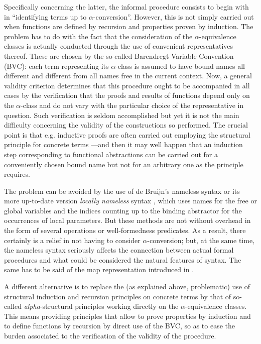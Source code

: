 \documentclass{entcs}
\begin{document}
Specifically concerning the latter, the informal procedure consists to begin with in ``identifying terms up to $\alpha$-conversion''. However, this is not simply carried out when functions are defined by recursion and properties proven by induction. The problem has to do with the fact that the consideration of the $\alpha$-equivalence classes is actually conducted through the use of convenient representatives thereof. These are chosen by the so-called Barendregt Variable Convention (BVC): each term representing its $\alpha$-class is assumed to have bound names all different and different from all names free in the current context. Now, a general validity criterion determines that this procedure ought to be accompanied in all cases by the verification that the proofs and results of functions depend only on the $\alpha$-class and do not vary with the particular choice of the representative in question. Such verification is seldom accomplished but yet it is not the main difficulty concerning the validity of the constructions so performed. The crucial point is that e.g. inductive proofs are often carried out employing the structural principle for concrete terms ---and then it may well happen that an induction step corresponding to functional abstractions can be carried out for a conveniently chosen bound name but not for an arbitrary one as the principle requires.

The problem can be avoided by the use of de Bruijn's nameless syntax \cite{deBruijn1972} or its more up-to-date version \textit{locally nameless} syntax \cite{aydemir08,chargueraud12}, which uses names for the free or global variables and the indices counting up to the binding abstractor for the occurrences of local parameters. But these methods are not without overhead in the form of  several operations or well-formedness predicates.
As a result, there certainly is a relief in not having to consider $\alpha$-conversion; but, at the same time, the nameless syntax seriously affects the connection between actual formal procedures and what could be considered the natural features of syntax.
The same has to be said of the map representation introduced in \cite{sato}.

A different alternative is to replace the (as explained above, problematic) use of structural induction and recursion principles on concrete terms by that of so-called \emph{alpha}-structural principles working directly on the $\alpha$-equivalence classes. This means providing principles that allow to prove properties by induction and to define functions by recursion by direct use of the BVC, so as to ease the burden associated to the verification of the validity of the procedure.
\end{document}
